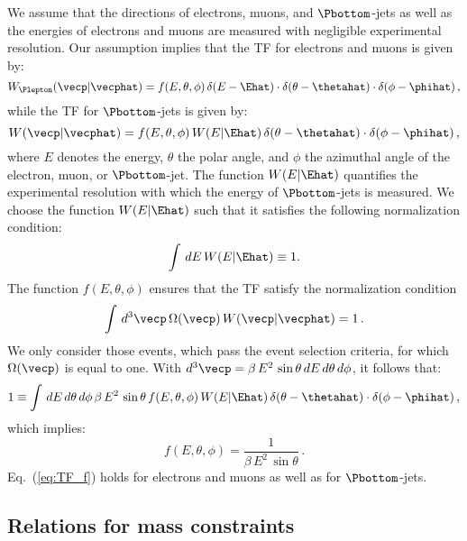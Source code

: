 We assume that the directions of electrons, muons, and $\Pbottom$-jets
as well as the energies of electrons and muons are measured with negligible experimental resolution.
Our assumption implies that the TF for electrons and muons is given by:
\begin{equation}
W_{\Plepton}(\vecp|\vecphat) = f(E,\theta,\phi) \, \delta(E - \Ehat) \cdot \delta(\theta - \thetahat) \cdot \delta(\phi - \phihat) \, ,
\label{eq:TF_ell}
\end{equation}
while the TF for $\Pbottom$-jets is given by:
\begin{equation}
W(\vecp|\vecphat) = f(E,\theta,\phi) \, W(E|\Ehat) \, \delta(\theta - \thetahat) \cdot \delta(\phi - \phihat) \, ,
\label{eq:TF_b}
\end{equation}
where $E$ denotes the energy, $\theta$ the polar angle, and $\phi$ the azimuthal angle of the electron, muon, or $\Pbottom$-jet.
The function $W(E|\Ehat)$ quantifies the experimental resolution with which the energy of $\Pbottom$-jets is measured.
We choose the function $W(E|\Ehat)$ such that it satisfies the following normalization condition:
\begin{equation*}
\int \, dE \, W(E|\Ehat) \equiv 1.
\end{equation*}
The function $f(E,\theta,\phi)$ ensures that the TF satisfy the normalization condition 
\begin{equation*}
\int \, d^{3}\vecp \, \Omega(\vecp) \, W(\vecp|\vecphat) = 1 \, .
\end{equation*}
We only consider those events, which pass the event selection criteria, \ie for which $\Omega(\vecp)$ is equal to one.
With $d^{3}\vecp = \beta \, E^{2} \, \sin\theta \, dE \, d\theta \, d\phi$, it follows that:
\begin{equation*}
1 \equiv \int \, dE \, d\theta \, d\phi \, \beta \, E^{2} \, \sin\theta \, f(E, \theta, \phi) \, W(E|\Ehat) \, \delta(\theta - \thetahat) \cdot \delta(\phi - \phihat) \, ,
\end{equation*}
which implies:
\begin{equation}
f(E,\theta,\phi) = \frac{1}{\beta \, E^{2} \, \sin\theta} \, .
\label{eq:TF_f}
\end{equation}
Eq.~(\ref{eq:TF_f}) holds for electrons and muons as well as for $\Pbottom$-jets.


\subsection{Relations for mass constraints}
\label{sec:appendix_mass_constraints}

